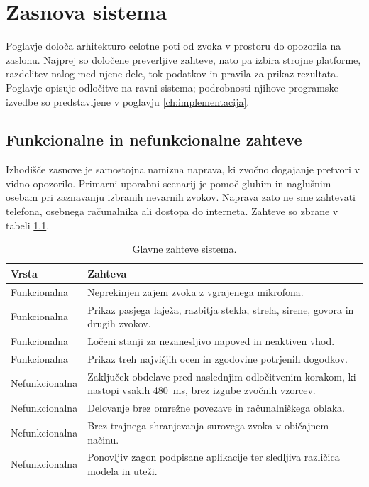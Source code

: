 \chapter{Zasnova sistema}
\label{ch:zasnova}

Poglavje določa arhitekturo celotne poti od zvoka v prostoru do opozorila na
zaslonu. Najprej so določene preverljive zahteve, nato pa izbira strojne
platforme, razdelitev nalog med njene dele, tok podatkov in pravila za prikaz
rezultata. Poglavje opisuje odločitve na ravni sistema; podrobnosti njihove
programske izvedbe so predstavljene v poglavju \ref{ch:implementacija}.

\section{Funkcionalne in nefunkcionalne zahteve}

Izhodišče zasnove je samostojna namizna naprava, ki zvočno dogajanje pretvori
v vidno opozorilo. Primarni uporabni scenarij je pomoč gluhim in naglušnim
osebam pri zaznavanju izbranih nevarnih zvokov. Naprava zato ne sme zahtevati
telefona, osebnega računalnika ali dostopa do interneta. Zahteve so zbrane v
tabeli \ref{tab:zahteve-sistema}.

\begin{table}[H]
  \centering
  \caption{Glavne zahteve sistema.}
  \label{tab:zahteve-sistema}
  \small
  \begin{tabular}{p{}p{}}
    \toprule
    Vrsta & Zahteva \\
    \midrule
    Funkcionalna & Neprekinjen zajem zvoka z vgrajenega mikrofona. \\
    Funkcionalna & Prikaz pasjega laježa, razbitja stekla, strela, sirene,
                   govora in drugih zvokov. \\
    Funkcionalna & Ločeni stanji za nezanesljivo napoved in neaktiven vhod. \\
    Funkcionalna & Prikaz treh najvišjih ocen in zgodovine potrjenih dogodkov. \\
    Nefunkcionalna & Zaključek obdelave pred naslednjim odločitvenim korakom,
                     ki nastopi vsakih \SI{480}{\milli\second}, brez izgube
                     zvočnih vzorcev. \\
    Nefunkcionalna & Delovanje brez omrežne povezave in računalniškega oblaka. \\
    Nefunkcionalna & Brez trajnega shranjevanja surovega zvoka v običajnem načinu. \\
    Nefunkcionalna & Ponovljiv zagon podpisane aplikacije ter sledljiva različica
                     modela in uteži. \\
    \bottomrule
  \end{tabular}
\end{table}

